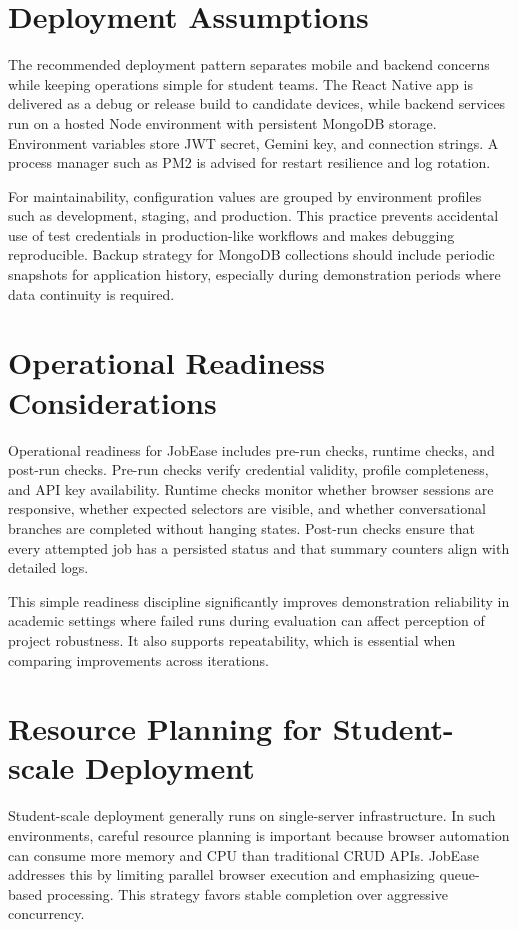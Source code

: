 \documentclass[12pt,a4paper,oneside]{report}
\begin{document}
\section{Deployment Assumptions}
The recommended deployment pattern separates mobile and backend concerns while keeping operations simple for student teams. The React Native app is delivered as a debug or release build to candidate devices, while backend services run on a hosted Node environment with persistent MongoDB storage. Environment variables store JWT secret, Gemini key, and connection strings. A process manager such as PM2 is advised for restart resilience and log rotation.

For maintainability, configuration values are grouped by environment profiles such as development, staging, and production. This practice prevents accidental use of test credentials in production-like workflows and makes debugging reproducible. Backup strategy for MongoDB collections should include periodic snapshots for application history, especially during demonstration periods where data continuity is required.

\section{Operational Readiness Considerations}
Operational readiness for JobEase includes pre-run checks, runtime checks, and post-run checks. Pre-run checks verify credential validity, profile completeness, and API key availability. Runtime checks monitor whether browser sessions are responsive, whether expected selectors are visible, and whether conversational branches are completed without hanging states. Post-run checks ensure that every attempted job has a persisted status and that summary counters align with detailed logs.

This simple readiness discipline significantly improves demonstration reliability in academic settings where failed runs during evaluation can affect perception of project robustness. It also supports repeatability, which is essential when comparing improvements across iterations.

\section{Resource Planning for Student-scale Deployment}
Student-scale deployment generally runs on single-server infrastructure. In such environments, careful resource planning is important because browser automation can consume more memory and CPU than traditional CRUD APIs. JobEase addresses this by limiting parallel browser execution and emphasizing queue-based processing. This strategy favors stable completion over aggressive concurrency.
\end{document}

